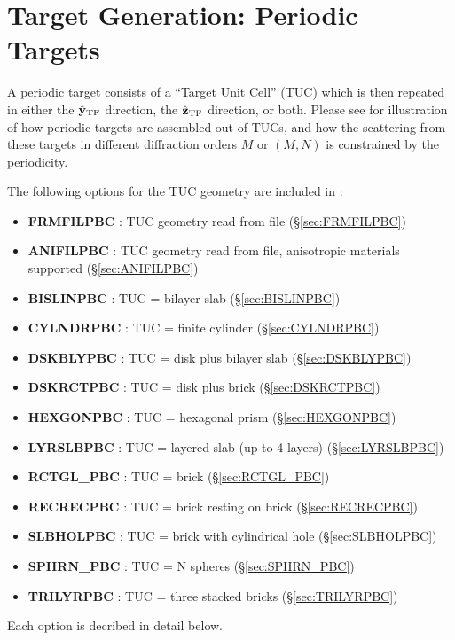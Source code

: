 \section{Target Generation: Periodic Targets
         \label{sec:target_generation_PBC}}
A periodic target consists of a ``Target Unit Cell'' (TUC) which is then
repeated in either the $\hat{\bf y}_{\rm TF}$ direction, the $\hat{\bf z}_{\rm TF}$ direction, or
both.  Please see \citet{Draine+Flatau_2008a} for illustration of how
periodic targets are assembled out of TUCs, and how the scattering from these
targets in different diffraction orders $M$ or $(M,N)$
is constrained by the periodicity.

The following options for the TUC geometry are included in \ddscat:
\begin{itemize}
\item {\bf FRMFILPBC} : TUC geometry read from file (\S\ref{sec:FRMFILPBC})
\item {\bf ANIFILPBC} : TUC geometry read from file, anisotropic materials 
                        supported (\S\ref{sec:ANIFILPBC})
\item {\bf BISLINPBC} : TUC = bilayer slab (\S\ref{sec:BISLINPBC})
\item {\bf CYLNDRPBC} : TUC = finite cylinder (\S\ref{sec:CYLNDRPBC})
\item {\bf DSKBLYPBC} : TUC = disk plus bilayer slab (\S\ref{sec:DSKBLYPBC})
\item {\bf DSKRCTPBC} : TUC = disk plus brick (\S\ref{sec:DSKRCTPBC})
\item {\bf HEXGONPBC} : TUC = hexagonal prism (\S\ref{sec:HEXGONPBC})
\item {\bf LYRSLBPBC} : TUC = layered slab (up to 4 layers) 
                        (\S\ref{sec:LYRSLBPBC})
\item {\bf RCTGL\_PBC} : TUC = brick (\S\ref{sec:RCTGL_PBC})
\item {\bf RECRECPBC} : TUC = brick resting on brick (\S\ref{sec:RECRECPBC})
\item {\bf SLBHOLPBC} : TUC = brick with cylindrical hole 
                        (\S\ref{sec:SLBHOLPBC})
\item {\bf SPHRN\_PBC} : TUC = N spheres (\S\ref{sec:SPHRN_PBC})
\item {\bf TRILYRPBC} : TUC = three stacked bricks (\S\ref{sec:TRILYRPBC})
\end{itemize}
Each option is decribed in detail below.
